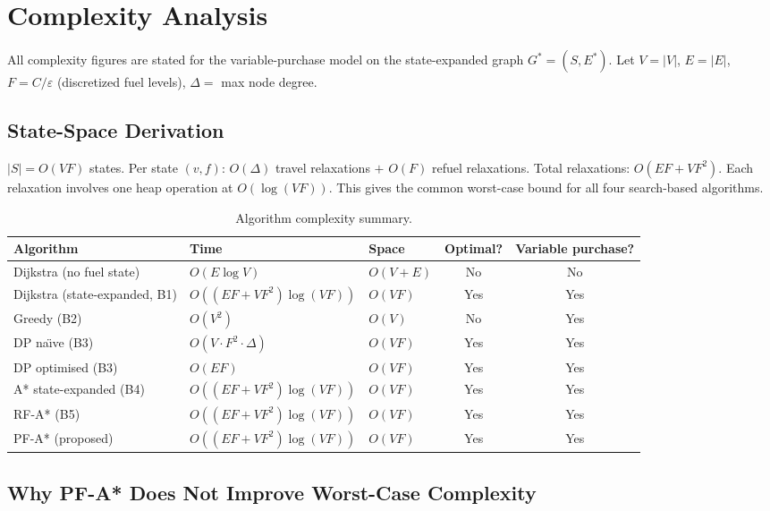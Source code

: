\chapter{Complexity Analysis}
\label{ch:complexity}

All complexity figures are stated for the variable-purchase model on the state-expanded graph
$G^{*} = (S, E^{*})$.
Let $V = |V|$, $E = |E|$, $F = C/\varepsilon$ (discretized fuel levels),
$\Delta = $ max node degree.

\section{State-Space Derivation}

$|S| = O(VF)$ states.
Per state $(v,f)$: $O(\Delta)$ travel relaxations $+$ $O(F)$ refuel relaxations.
Total relaxations: $O(EF + VF^{2})$.
Each relaxation involves one heap operation at $O(\log(VF))$.
This gives the common worst-case bound for all four search-based algorithms.

\begin{table}[ht]
\centering
\caption{Algorithm complexity summary.}
\label{tab:complexity}
\small
\begin{tabular}{lllcc}
\toprule
Algorithm & Time & Space & Optimal? & Variable purchase? \\
\midrule
Dijkstra (no fuel state)       & $O(E\log V)$                   & $O(V{+}E)$ & No  & No \\
Dijkstra (state-expanded, B1)  & $O((EF{+}VF^{2})\log(VF))$    & $O(VF)$    & Yes & Yes \\
Greedy (B2)                    & $O(V^{2})$                      & $O(V)$     & No  & Yes \\
DP na\"{\i}ve (B3)             & $O(V{\cdot}F^{2}{\cdot}\Delta)$ & $O(VF)$    & Yes & Yes \\
DP optimised (B3)              & $O(EF)$                         & $O(VF)$    & Yes & Yes \\
A* state-expanded (B4)         & $O((EF{+}VF^{2})\log(VF))$    & $O(VF)$    & Yes & Yes \\
RF-A* (B5)                     & $O((EF{+}VF^{2})\log(VF))$    & $O(VF)$    & Yes & Yes \\
PF-A* (proposed)               & $O((EF{+}VF^{2})\log(VF))$    & $O(VF)$    & Yes & Yes \\
\bottomrule
\end{tabular}
\end{table}

\section{Why PF-A* Does Not Improve Worst-Case Complexity}

